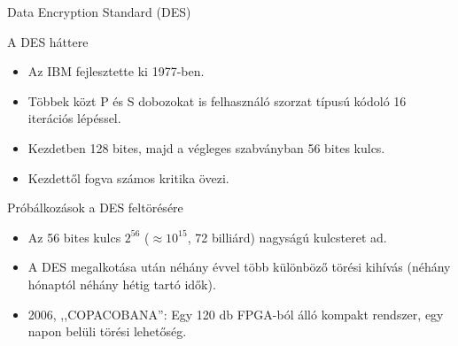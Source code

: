 \documentclass[12 pt]{beamer}
\begin{document}
\begin{frame}{Data Encryption Standard (DES)}
  \begin{block}{A DES háttere}
    \begin{itemize}
      \item{Az IBM fejlesztette ki 1977-ben.}
      \item{Többek közt P és S dobozokat is felhasználó szorzat típusú kódoló 16 iterációs lépéssel.}
      \item{Kezdetben 128 bites, majd a végleges szabványban 56 bites kulcs.}
      \item{Kezdettől fogva számos kritika övezi.}
    \end{itemize}
  \end{block}

  \begin{block}{Próbálkozások a DES feltörésére}
    \begin{itemize}
      \item{Az 56 bites kulcs $2^{56}$ ($\approx 10^{15}$, 72 billiárd) nagyságú kulcsteret ad.}
      \item{A DES megalkotása után néhány évvel több különböző törési kihívás (néhány hónaptól néhány hétig tartó idők).}
      \item{2006, ,,COPACOBANA'': Egy 120 db FPGA-ból álló kompakt rendszer, egy napon belüli törési lehetőség.}
    \end{itemize}

  \end{block}

\end{frame}
\end{document}

